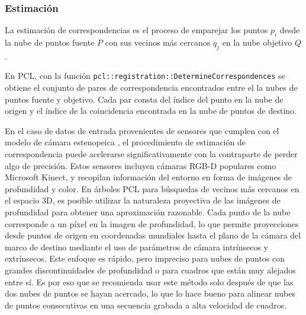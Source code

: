 \subsubsection{Estimación}
La estimación de correspondencias es el proceso de emparejar los puntos $p_i$ desde la nube de puntos fuente $P$ con sus vecinos más cercanos $q_j$ en la nube objetivo $Q$. 

En PCL, con la función \lstinline{pcl::registration::DetermineCorrespondences} se obtiene el conjunto de pares de correspondencia encontrados entre el la nubes de puntos fuente y objetivo. Cada par consta del índice del punto en la nube de origen y el índice de la coincidencia encontrada en la nube de puntos de destino. 

En el caso de datos de entrada provenientes de sensores que cumplen con el modelo de cámara estenopeica \cite{kaehler2017}, el procedimiento de estimación de correspondencia puede acelerarse significativamente con la contraparte de perder algo de precisión. Estos sensores incluyen cámaras RGB-D populares como Microsoft Kinect, y recopilan información del entorno en forma de imágenes de profundidad y color. En árboles PCL para búsquedas de vecinos más cercanos en el espacio 3D, es posible utilizar la naturaleza proyectiva de las imágenes de profundidad para obtener una aproximación razonable. Cada punto de la nube corresponde a un píxel en la imagen de profundidad, lo que permite proyecciones desde puntos de origen en coordenadas mundiales hasta el plano de la cámara del marco de destino mediante el uso de parámetros de cámara intrínsecos y extrínsecos. Este enfoque es rápido, pero impreciso para nubes de puntos con grandes discontinuidades de profundidad o para cuadros que están muy alejados entre sí. Es por eso que se recomienda usar este método solo después de que las dos nubes de puntos se hayan acercado, lo que lo hace bueno para alinear nubes de puntos consecutivas en una secuencia grabada a alta velocidad de cuadros.


